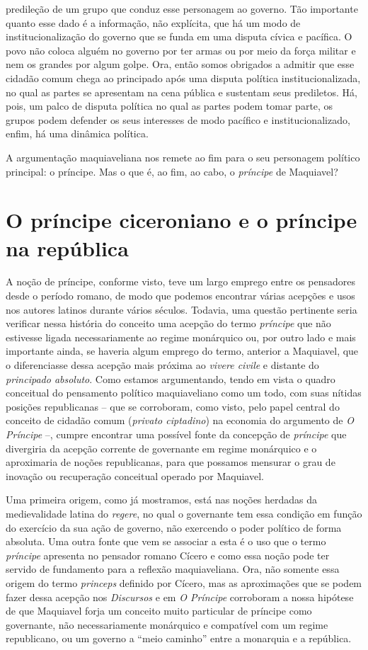 predileção de um grupo que conduz esse personagem ao governo. Tão
importante quanto esse dado é a informação, não explícita, que há um
modo de institucionalização do governo que se funda em uma disputa
cívica e pacífica. O povo não coloca alguém no governo por ter armas ou
por meio da força militar e nem os grandes por algum golpe. Ora, então
somos obrigados a admitir que esse cidadão comum chega ao principado
após uma disputa política institucionalizada, no qual as partes se
apresentam na cena pública e sustentam seus prediletos. Há, pois, um
palco de disputa política no qual as partes podem tomar parte, os grupos
podem defender os seus interesses de modo pacífico e institucionalizado,
enfim, há uma dinâmica política.

A argumentação maquiaveliana nos remete ao fim para o seu personagem
político principal: o príncipe. Mas o que é, ao fim, ao cabo, o
\emph{príncipe} de Maquiavel?

\section{O príncipe ciceroniano e o príncipe na república}

A noção de príncipe, conforme visto, teve um largo emprego entre os
pensadores desde o período romano, de modo que podemos encontrar várias
acepções e usos nos autores latinos durante vários séculos. Todavia, uma
questão pertinente seria verificar nessa história do conceito uma
acepção do termo \emph{príncipe} que não estivesse ligada
necessariamente ao regime monárquico ou, por outro lado e mais
importante ainda, se haveria algum emprego do termo, anterior a
Maquiavel, que o diferenciasse dessa acepção mais próxima ao
\emph{vivere civile} e distante do \emph{principado absoluto}. Como
estamos argumentando, tendo em vista o quadro conceitual do pensamento
político maquiaveliano como um todo, com suas nítidas posições
republicanas -- que se corroboram, como visto, pelo papel central do
conceito de cidadão comum (\emph{privato ciptadino}) na economia do
argumento de \emph{O Príncipe} --, cumpre encontrar uma possível fonte
da concepção de \emph{príncipe} que divergiria da acepção corrente de
governante em regime monárquico e o aproximaria de noções republicanas,
para que possamos mensurar o grau de inovação ou recuperação conceitual
operado por Maquiavel.

Uma primeira origem, como já mostramos, está nas noções herdadas da
medievalidade latina do \emph{regere}, no qual o governante tem essa
condição em função do exercício da sua ação de governo, não exercendo o
poder político de forma absoluta. Uma outra fonte que vem se associar a
esta é o uso que o termo \emph{príncipe} apresenta no pensador romano
Cícero e como essa noção pode ter servido de fundamento para a reflexão
maquiaveliana. Ora, não somente essa origem do termo \emph{princeps}
definido por Cícero, mas as aproximações que se podem fazer dessa
acepção nos \emph{Discursos} e em \emph{O Príncipe} corroboram a nossa
hipótese de que Maquiavel forja um conceito muito particular de príncipe
como governante, não necessariamente monárquico e compatível com um
regime republicano, ou um governo a ``meio caminho'' entre a monarquia e
a república.

